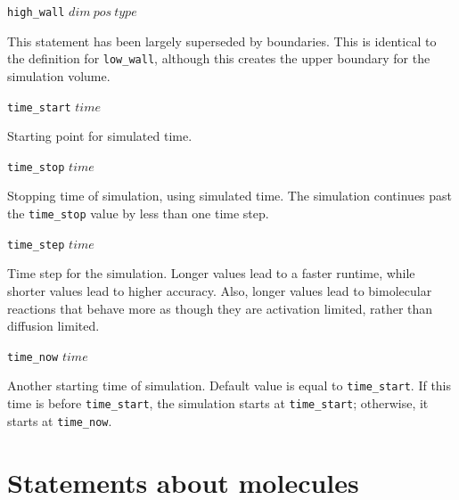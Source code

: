 \documentclass {book}
\newcommand {\ttt} {\texttt}
\begin{document}
\begin{description}
\item{\ttt{high\_wall} $dim\ pos\ type$}

This statement has been largely superseded by boundaries. This is identical to the definition for \ttt{low\_wall}, although this creates the upper boundary for the simulation volume.

\item{\ttt{time\_start} $time$}

Starting point for simulated time.

\item{\ttt{time\_stop} $time$}

Stopping time of simulation, using simulated time. The simulation continues past the \ttt{time\_stop} value by less than one time step.

\item{\ttt{time\_step} $time$}

Time step for the simulation. Longer values lead to a faster runtime, while shorter values lead to higher accuracy. Also, longer values lead to bimolecular reactions that behave more as though they are activation limited, rather than diffusion limited.

\item{\ttt{time\_now} $time$}

Another starting time of simulation. Default value is equal to \ttt{time\_start}. If this time is before \ttt{time\_start}, the simulation starts at \ttt{time\_start}; otherwise, it starts at \ttt{time\_now}.

\end{description}

\section{Statements about molecules}
\end{document}
